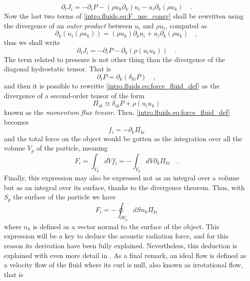 \begin{equation}\label{intro.fluids.eq:F_use_consv}
    \partial_t J_i = -\partial_i P - (\rho u_k\partial_k) u_i -  u_i\partial_k(\rho u_k)\quad.
\end{equation}
Now the last two terms of \ref{intro.fluids.eq:F_use_consv} shall be rewritten using the divergence of an \textit{outer product} between $u_i$ and $\rho u_i$, computed as
\begin{equation}\label{intro.fluids.eq:F_div_dyadic_product}
    \partial_k\left( u_i(\rho u_k)\right) = (\rho u_k)\partial_k u_i + u_i \partial_k(\rho u_k)\quad,
\end{equation}
thus we shall write
\begin{equation}\label{intro.fluids.F_tensor_1}
     \partial_t J_i = -\partial_i P - \partial_k\left(\rho(u_i u_k)\right)\quad.
\end{equation}
The term related to pressure is not other thing than the divergence of the diagonal hydrostatic tensor. That is
\begin{equation}
    \partial_i P = \partial_k(\delta_{ki}P)\quad,
\end{equation}
and then it is possible to rewritte \ref{intro.fluids.eq:force_fluid_def} as the divergence of a second-order tensor of the form
\begin{equation}\label{intro.fluids.eq:flux_momentum_tensor}
    \Pi_{ik} \equiv \delta_{ik}P + \rho(u_i u_k)
\end{equation}
known as the \textit{momentum flux tensor}. Then, \ref{intro.fluids.eq:force_fluid_def} becomes
\begin{equation}
    f_i = -\partial_k\Pi_{ki}
\end{equation}
and the total force on the object would be gotten as the integration over all the volume $V_p$ of the particle, meaning
\begin{equation}\label{intro.fluids.eq:Force_volume_tensor}
    F_i = \int_{V_p} dV f_i  = -\int_{V_p} dV \partial_k\Pi_{ki}\quad.
\end{equation}
Finally, this expression may also be expressed not as an integral over a volume but as an integral over its surface, thanks to the divergence theorem. Thus, with $S_p$ the surface of the particle we have
\begin{equation}\label{intro.fluids.eq:Force_surface_tensor}
    F_i = -\oint_{\partial V_p} dS n_k\Pi_{ki}
\end{equation}
where $n_k$ is defined as a vector normal to the surface of the object. This expression will be a key to deduce the acoustic radiation force, and for this reason its derivation have been fully explained. Nevertheless, this deduction is explained with even more detail in \cite[app.~A]{Manneberg2009}. As a final remark, an ideal flow is defined as a velocity flow of the fluid where its curl is null, also known as irrotational flow, that is
